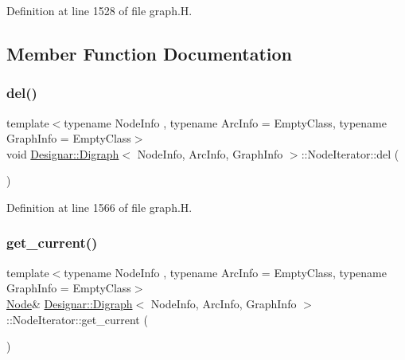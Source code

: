 Definition at line 1528 of file graph.\+H.



\subsection{Member Function Documentation}
\mbox{\label{class_designar_1_1_digraph_1_1_node_iterator_a8d68d82384631f601055ef9b742b0dbf}} 
\subsubsection{\texorpdfstring{del()}{del()}}
{\footnotesize\ttfamily template$<$typename Node\+Info , typename Arc\+Info  = Empty\+Class, typename Graph\+Info  = Empty\+Class$>$ \\
void \hyperlink{class_designar_1_1_digraph}{Designar\+::\+Digraph}$<$ Node\+Info, Arc\+Info, Graph\+Info $>$\+::Node\+Iterator\+::del (\begin{DoxyParamCaption}{ }\end{DoxyParamCaption})\hspace{0.3cm}{\ttfamily [inline]}}



Definition at line 1566 of file graph.\+H.

\mbox{\label{class_designar_1_1_digraph_1_1_node_iterator_a2d9961869a4ec52a112354600094646c}} 
\subsubsection{\texorpdfstring{get\+\_\+current()}{get\_current()}\hspace{0.1cm}{\footnotesize\ttfamily [1/2]}}
{\footnotesize\ttfamily template$<$typename Node\+Info , typename Arc\+Info  = Empty\+Class, typename Graph\+Info  = Empty\+Class$>$ \\
\hyperlink{class_designar_1_1_digraph_a4dc921c41a480b7946a04170e997d8ae}{Node}\& \hyperlink{class_designar_1_1_digraph}{Designar\+::\+Digraph}$<$ Node\+Info, Arc\+Info, Graph\+Info $>$\+::Node\+Iterator\+::get\+\_\+current (\begin{DoxyParamCaption}{ }\end{DoxyParamCaption})\hspace{0.3cm}{\ttfamily [inline]}}



